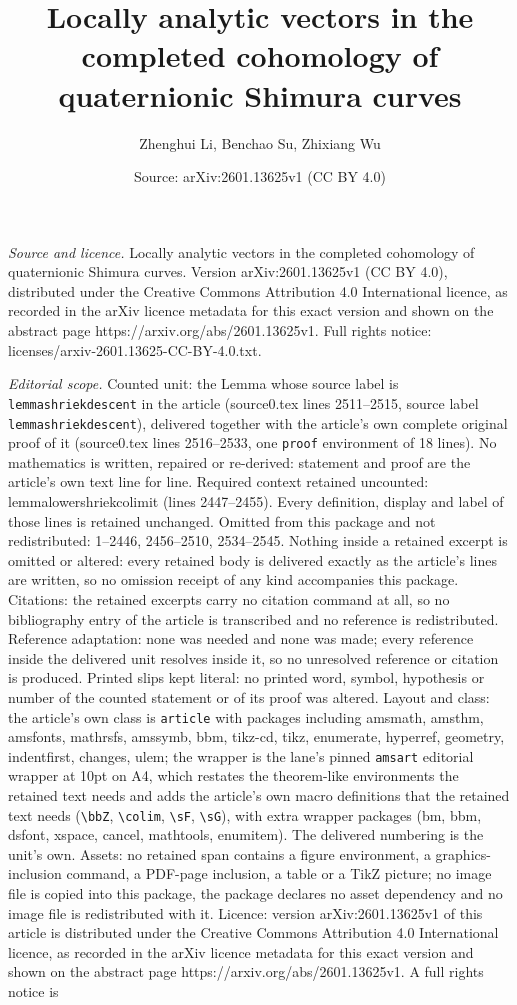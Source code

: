 \documentclass[10pt,a4paper]{amsart}
\title[Locally analytic vectors in the completed cohomology of quat]{Locally analytic vectors in the completed cohomology of quaternionic Shimura curves}
\author{Zhenghui Li, Benchao Su, Zhixiang Wu}
\date{Source: arXiv:2601.13625v1 (CC BY 4.0)}
\begin{document}
\maketitle

\noindent\emph{Source and licence.} Locally analytic vectors in the completed cohomology of quaternionic Shimura curves. Version arXiv:2601.13625v1 (CC BY 4.0), distributed under the Creative Commons Attribution 4.0 International licence, as recorded in the arXiv licence metadata for this exact version and shown on the abstract page https://arxiv.org/abs/2601.13625v1. Full rights notice: licenses/arxiv-2601.13625-CC-BY-4.0.txt.\par\smallskip

\noindent\textit{Editorial scope.} Counted unit: the Lemma whose source label is \texttt{lemmashriekdescent} in the article (source0.tex lines 2511--2515, source label \texttt{lemmashriekdescent}), delivered together with the article's own complete original proof of it (source0.tex lines 2516--2533, one \texttt{proof} environment of 18 lines). No mathematics is written, repaired or re-derived: statement and proof are the article's own text line for line. Required context retained uncounted: lemmalowershriekcolimit (lines 2447--2455). Every definition, display and label of those lines is retained unchanged. Omitted from this package and not redistributed: 1--2446, 2456--2510, 2534--2545. Nothing inside a retained excerpt is omitted or altered: every retained body is delivered exactly as the article's lines are written, so no omission receipt of any kind accompanies this package. Citations: the retained excerpts carry no citation command at all, so no bibliography entry of the article is transcribed and no reference is redistributed. Reference adaptation: none was needed and none was made; every reference inside the delivered unit resolves inside it, so no unresolved reference or citation is produced. Printed slips kept literal: no printed word, symbol, hypothesis or number of the counted statement or of its proof was altered. Layout and class: the article's own class is \texttt{article} with packages including amsmath, amsthm, amsfonts, mathrsfs, amssymb, bbm, tikz-cd, tikz, enumerate, hyperref, geometry, indentfirst, changes, ulem; the wrapper is the lane's pinned \texttt{amsart} editorial wrapper at 10pt on A4, which restates the theorem-like environments the retained text needs and adds the article's own macro definitions that the retained text needs (\texttt{\textbackslash bbZ}, \texttt{\textbackslash colim}, \texttt{\textbackslash sF}, \texttt{\textbackslash sG}), with extra wrapper packages (bm, bbm, dsfont, xspace, cancel, mathtools, enumitem). The delivered numbering is the unit's own. Assets: no retained span contains a figure environment, a graphics-inclusion command, a PDF-page inclusion, a table or a TikZ picture; no image file is copied into this package, the package declares no asset dependency and no image file is redistributed with it. Licence: version arXiv:2601.13625v1 of this article is distributed under the Creative Commons Attribution 4.0 International licence, as recorded in the arXiv licence metadata for this exact version and shown on the abstract page https://arxiv.org/abs/2601.13625v1. A full rights notice is 
\end{document}
